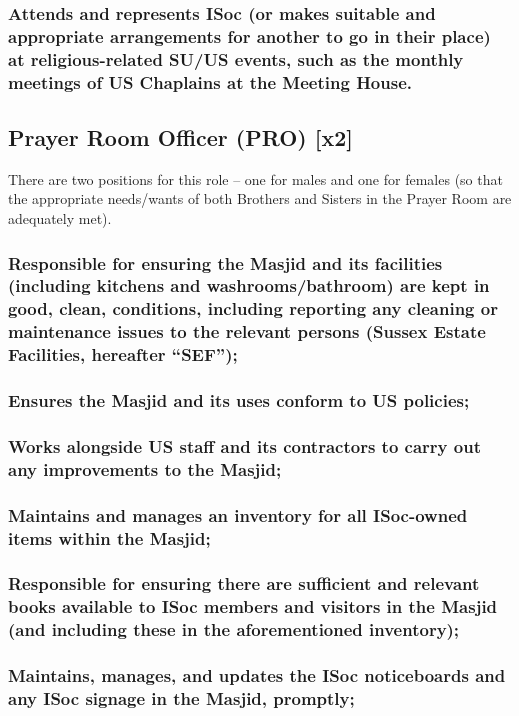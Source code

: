 \documentclass[12pt]{article}
\begin{document}
\subsubsection{Attends and represents ISoc (or makes suitable and appropriate arrangements for another to go in their place) at religious-related SU/US events, such as the monthly meetings of US Chaplains at the Meeting House.}
\hspace{1pt}

\subsection{Prayer Room Officer (PRO) [x2]}
There are two positions for this role -- one for males and one for females (so that the appropriate needs/wants of both Brothers and Sisters in the Prayer Room are adequately met).
\subsubsection{Responsible for ensuring the Masjid and its facilities (including kitchens and washrooms/bathroom) are kept in good, clean, conditions, including reporting any cleaning or maintenance issues to the relevant persons (Sussex Estate Facilities, hereafter ``SEF'');}
\subsubsection{Ensures the Masjid and its uses conform to US policies;}
\subsubsection{Works alongside US staff and its contractors to carry out any improvements to the Masjid;}
\subsubsection{Maintains and manages an inventory for all ISoc-owned items within the Masjid;}
\subsubsection{Responsible for ensuring there are sufficient and relevant books available to ISoc members and visitors in the Masjid (and including these in the aforementioned inventory);}
\subsubsection{Maintains, manages, and updates the ISoc noticeboards and any ISoc signage in the Masjid, promptly;}
\end{document}
